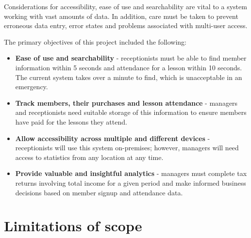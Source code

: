 Considerations for accessibility, ease of use and searchability are vital to a system working with vast amounts of data. In addition, care must be taken to prevent erroneous data entry, error states and problems associated with multi-user access.

The primary objectives of this project included the following:
\begin{itemize}
    \item \textbf{Ease of use and searchability} - receptionists must be able to find member information within 5 seconds and attendance for a lesson within 10 seconds. The current system takes over a minute to find, which is unacceptable in an emergency.
    \item \textbf{Track members, their purchases and lesson attendance} - managers and receptionists need suitable storage of this information to ensure members have paid for the lessons they attend.
    \item \textbf{Allow accessibility across multiple and different devices} - receptionists will use this system on-premises; however, managers will need access to statistics from any location at any time.
    \item \textbf{Provide valuable and insightful analytics} - managers must complete tax returns involving total income for a given period and make informed business decisions based on member signup and attendance data.
\end{itemize}



\section{Limitations of scope}

